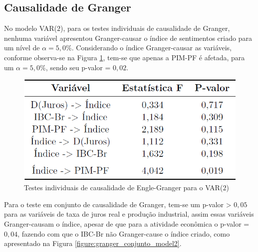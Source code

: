 \subsection{Causalidade de Granger}


No modelo VAR($2$), para os testes individuais de causalidade de Granger, nenhuma variável apresentou Granger-causar o índice de sentimentos criado para um nível de $\alpha = 5,0\%$. Considerando o índice Granger-causar as variáveis, conforme observa-se na Figura \ref{figure:granger_individual_model2}, tem-se que apenas a PIM-PF é afetada, para um $\alpha = 5,0\%$, sendo seu p-valor = $0,02$.

\begin{figure}[hbtp]
	\centering
	\caption{Testes individuais de causalidade de Engle-Granger para o VAR($2$)} \label{figure:granger_individual_model2}
	\includegraphics[scale = 0.45]{figuras/granger_individual_model2.PNG}
\end{figure}

Para o teste em conjunto de causalidade de Granger, tem-se um p-valor > $0,05$ para as variáveis de taxa de juros real e produção industrial, assim essas variáveis Granger-causam o índice, apesar de que para a atividade econômica o p-valor = $0,04$, fazendo com que o IBC-Br não Granger-cause o índice criado, como apresentado na Figura \ref{figure:granger_conjunto_model2}.

